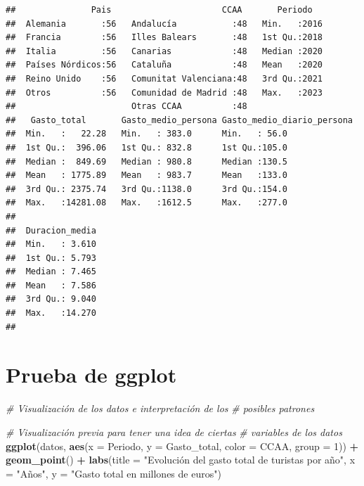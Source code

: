 \documentclass[data,article,submit,moreauthors,pdftex]{Definitions/mdpi}
\newenvironment{Shaded}{\begin{snugshade}}{\end{snugshade}}
\newcommand{\AttributeTok}[1]{\textcolor[rgb]{0.13,0.29,0.53}{#1}}
\newcommand{\CommentTok}[1]{\textcolor[rgb]{0.56,0.35,0.01}{\textit{#1}}}
\newcommand{\DecValTok}[1]{\textcolor[rgb]{0.00,0.00,0.81}{#1}}
\newcommand{\FunctionTok}[1]{\textcolor[rgb]{0.13,0.29,0.53}{\textbf{#1}}}
\newcommand{\NormalTok}[1]{#1}
\newcommand{\SpecialCharTok}[1]{\textcolor[rgb]{0.81,0.36,0.00}{\textbf{#1}}}
\newcommand{\StringTok}[1]{\textcolor[rgb]{0.31,0.60,0.02}{#1}}
\begin{document}
\begin{verbatim}
##               Pais                      CCAA       Periodo    
##  Alemania       :56   Andalucía           :48   Min.   :2016  
##  Francia        :56   Illes Balears       :48   1st Qu.:2018  
##  Italia         :56   Canarias            :48   Median :2020  
##  Países Nórdicos:56   Cataluña            :48   Mean   :2020  
##  Reino Unido    :56   Comunitat Valenciana:48   3rd Qu.:2021  
##  Otros          :56   Comunidad de Madrid :48   Max.   :2023  
##                       Otras CCAA          :48                 
##   Gasto_total       Gasto_medio_persona Gasto_medio_diario_persona
##  Min.   :   22.28   Min.   : 383.0      Min.   : 56.0             
##  1st Qu.:  396.06   1st Qu.: 832.8      1st Qu.:105.0             
##  Median :  849.69   Median : 980.8      Median :130.5             
##  Mean   : 1775.89   Mean   : 983.7      Mean   :133.0             
##  3rd Qu.: 2375.74   3rd Qu.:1138.0      3rd Qu.:154.0             
##  Max.   :14281.08   Max.   :1612.5      Max.   :277.0             
##                                                                   
##  Duracion_media  
##  Min.   : 3.610  
##  1st Qu.: 5.793  
##  Median : 7.465  
##  Mean   : 7.586  
##  3rd Qu.: 9.040  
##  Max.   :14.270  
## 
\end{verbatim}

\section{Prueba de ggplot}\label{prueba-de-ggplot}

\begin{Shaded}
\begin{Highlighting}[]
\CommentTok{\# Visualización de los datos e interpretación de los}
\CommentTok{\# posibles patrones}

\CommentTok{\# Visualización previa para tener una idea de ciertas}
\CommentTok{\# variables de los datos}
\FunctionTok{ggplot}\NormalTok{(datos, }\FunctionTok{aes}\NormalTok{(}\AttributeTok{x =}\NormalTok{ Periodo, }\AttributeTok{y =}\NormalTok{ Gasto\_total, }\AttributeTok{color =}\NormalTok{ CCAA,}
    \AttributeTok{group =} \DecValTok{1}\NormalTok{)) }\SpecialCharTok{+} \FunctionTok{geom\_point}\NormalTok{() }\SpecialCharTok{+} \FunctionTok{labs}\NormalTok{(}\AttributeTok{title =} \StringTok{"Evolución del gasto total de turistas por año"}\NormalTok{,}
    \AttributeTok{x =} \StringTok{"Años"}\NormalTok{, }\AttributeTok{y =} \StringTok{"Gasto total en millones de euros"}\NormalTok{)}
\end{Highlighting}
\end{Shaded}
\end{document}
